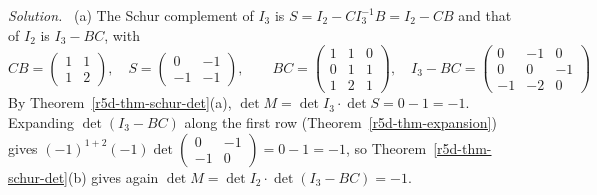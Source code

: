 \documentclass[12pt]{article}
\theoremstyle{definition}
\newenvironment{solution}{\par\noindent\textit{Solution.}\ }{\par\smallskip}
\begin{document}
\begin{solution}
(a) The Schur complement of \(I_3\) is \(S=I_2-CI_3^{-1}B=I_2-CB\) and that of \(I_2\) is
\(I_3-BC\), with
\[
CB=\begin{pmatrix}1&1\\1&2\end{pmatrix},\quad S=\begin{pmatrix}0&-1\\-1&-1\end{pmatrix},\qquad
BC=\begin{pmatrix}1&1&0\\0&1&1\\1&2&1\end{pmatrix},\quad
I_3-BC=\begin{pmatrix}0&-1&0\\0&0&-1\\-1&-2&0\end{pmatrix}
\]
By Theorem~\ref{r5d-thm-schur-det}(a), \(\det M=\det I_3\cdot\det S=0-1=-1\). Expanding
\(\det(I_3-BC)\) along the first row (Theorem~\ref{r5d-thm-expansion}) gives
\((-1)^{1+2}(-1)\det\left(\begin{smallmatrix}0&-1\\-1&0\end{smallmatrix}\right)=0-1=-1\), so
Theorem~\ref{r5d-thm-schur-det}(b) gives again \(\det M=\det I_2\cdot\det(I_3-BC)=-1\).


\end{solution}
\end{document}
